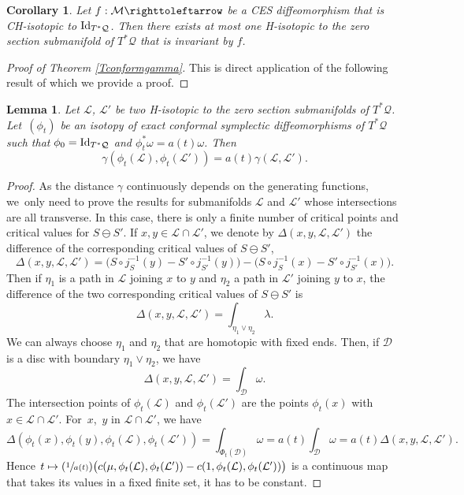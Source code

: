 \documentclass[JEP,XML,SOM,Unicode,published]{cedram}
\newcommand{\Psfrac}[2]{(\sfrac{#1}{#2})}
\def\mto{\mathchoice{\longmapsto}{\mapsto}{\mapsto}{\mapsto}}
\newtheorem{corollary}{Corollary}
\newtheorem{lemma}{Lemma}
\theoremstyle{definition}
\def\cD{{\mathcal D}}
\def\cL{{\mathcal L}}
\def\cM{{\mathcal M}}
\def\cQ{{\mathcal Q}}
\begin{document}
\begin{corollary}\label{Cunicityinavariant}
Let $f:\cM \righttoleftarrow$ be a CES diffeomorphism that is CH-isotopic to ${\rm Id}_{T^*\cQ}$. Then there exists at most one H-isotopic to the zero section submanifold of $T^*\cQ$ that is invariant by $f$.
\end{corollary}

\begin{proof}[Proof of Theorem \ref{Tconformgamma}]
This is direct application of the following result of which we provide a proof.
\end{proof}

\begin{lemma}\label{Lconformgamma}
Let $\cL$, $\cL'$ be two H-isotopic to the zero section submanifolds of $T^*\cQ$. Let~$(\phi_t)$ be an isotopy of exact conformal symplectic diffeomorphisms of $T^*\cQ$ such that $\phi_0={\rm Id}_{T^*\cQ}$ and $\phi_t^*\omega=a(t)\omega$. Then
\[
\gamma(\phi_t(\cL), \phi_t(\cL'))=a(t)\gamma(\cL, \cL').
\]
\end{lemma}

\begin{proof} As the distance $\gamma$ continuously depends on the generating functions, we~only need to prove the results for submanifolds $\cL$ and $\cL'$ whose intersections are all transverse. In this case, there is only a finite number of critical points and critical values for $S\ominus S'$. If $x, y\in\cL\cap\cL'$, we denote by $\Delta(x, y, \cL, \cL')$ the difference of the corresponding critical values of $S\ominus S'$, \ie
\[
\Delta(x, y, \cL, \cL')=\Big(S\circ j_S^{-1}(y)-S'\circ j_{S'}^{-1}(y)\Big)-\Big(S\circ j_S^{-1}(x)-S'\circ j_{S'}^{-1}(x)\Big).
\]
Then if $\eta_1$ is a path in $\cL$ joining $x$ to $y$ and $\eta_2$ a path in $\cL'$ joining $y$ to $x$, the difference of the two corresponding critical values of $S\ominus S'$ is
\[
\Delta(x, y, \cL, \cL')=\int_{\eta_1\vee\eta_2}\lambda.
\]
We can always choose $\eta_1$ and $\eta_2$ that are homotopic with fixed ends. Then, if $\cD$ is a disc with boundary $\eta_1\vee\eta_2$, we have
\[
\Delta(x, y, \cL, \cL')=\int_{\cD}\omega.
\]
The intersection points of $\phi_t(\cL)$ and $\phi_t(\cL')$ are the points $\phi_t(x)$ with $x\in\cL\cap \cL'$. For~$x$,~$y$ in $\cL\cap\cL'$, we have
\[
\Delta(\phi_t(x), \phi_t(y), \phi_t(\cL), \phi_t(\cL'))=\int_{\Phi_t(\cD)}\omega=a(t)\int_\cD\omega=a(t)\Delta(x, y, \cL, \cL').
\]
Hence $t\mto \Psfrac{1}{a(t)}\big(c(\mu, \phi_t(\cL), \phi_t(\cL'))-c(1, \phi_t(\cL), \phi_t(\cL'))\big)$ is a continuous map that takes its values in a fixed finite set, it has to be constant.
\end{proof}
\end{document}

